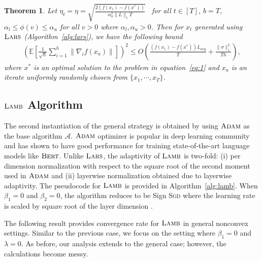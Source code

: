 \documentclass{article} \usepackage{iclr2020_conference,times}
\def\eqref#1{equation~\ref{#1}}
\newtheorem{theorem}{Theorem}
\newcommand{\bert}{\textsc{Bert}\xspace}
\newcommand{\sgd}{\textsc{Sgd}\xspace}
\newcommand{\adam}{\textsc{Adam}}
\newcommand{\lamb}{\textsc{Lamb}}
\newcommand{\lars}{\textsc{Lars}}
\begin{document}
\begin{theorem}
\label{thm:lars-conv}
Let $\eta_t = \eta = \sqrt{\tfrac{2(f(x_1) - f(x^*))}{\alpha_u^2 \|L\|_1 T}}$ \ for all $t \in [T]$, $b=T$, $\alpha_l \leq \phi(v) \leq \alpha_u$ for all $v > 0$ where $\alpha_l, \alpha_u > 0$. Then for $x_t$ generated using $\lars$ (Algorithm~\ref{alg:lars}), we have the following bound
\begin{align*}
\left(\mathbb{E}\left[\frac{1}{\sqrt{h}}\sum_{i=1}^h \|\nabla_i f(x_a)\|\right]\right)^2 \leq O\left(\frac{(f(x_1) - f(x^*))L_{avg}}{T} + \frac{\|\sigma \|^2_1}{Th}\right), 
\end{align*}
where $x^*$ is an optimal solution to the problem in \eqref{eq:1} and $x_a$ is an iterate uniformly randomly chosen from $\{x_1, \cdots, x_T\}$.
\end{theorem}

\subsection{$\lamb$ Algorithm}
\label{Subsection:lamb}

The second instantiation of the general strategy is obtained by using $\adam$ as the base algorithm $\mathcal{A}$. $\adam$ optimizer is popular in deep learning community and has shown to have good performance for training state-of-the-art language models like $\bert$. Unlike $\lars$, the adaptivity of $\lamb$ is two-fold: (i) per dimension normalization with respect to the square root of the second moment used in $\adam$ and (ii) layerwise normalization  obtained due to layerwise adaptivity. The pseudocode for $\lamb$ is provided in Algorithm~\ref{alg:lamb}. When $\beta_1 = 0$ and $\beta_2 = 0$, the algorithm reduces to be Sign \sgd where the learning rate is scaled by square root of the layer dimension \citep{signsgd}.

The following result provides convergence rate for $\lamb$ in general nonconvex settings. Similar to the previous case, we focus on the setting where $\beta_1 = 0$ and $\lambda = 0$. As before, our analysis extends to the general case; however, the calculations become messy.
\end{document}
